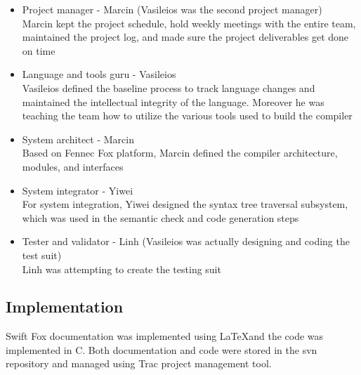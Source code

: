 \begin{itemize}
	\item Project manager - Marcin (Vasileios was the second project
	manager)\\Marcin kept the project schedule, hold weekly meetings
	with the entire team, maintained the project log, and made sure
	the project deliverables get done on time
	\item Language and tools guru - Vasileios\\
	Vasileios defined the baseline process to track language changes
	and maintained the intellectual integrity of the language. Moreover
	he was teaching the team how to utilize the various tools used to
	build the compiler
	\item System architect - Marcin\\
	Based on Fennec Fox platform, Marcin defined the compiler
	architecture, modules, and interfaces
	\item System integrator - Yiwei\\
	For system integration, Yiwei designed the syntax tree traversal
	subsystem, which was used in the semantic check and code generation 
	steps
	\item Tester and validator - Linh (Vasileios was actually designing
	and coding the test suit)\\
	Linh was attempting to create the testing suit
\end{itemize}

\subsection{Implementation}

Swift Fox documentation was implemented using \LaTeX  and the code was
implemented in C. Both documentation and code were stored in the svn \cite{svn}
repository and managed using Trac \cite{trac} project management tool.

